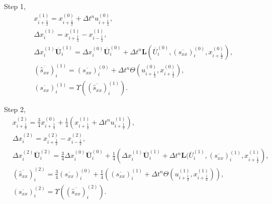 \documentclass{article}
\numberwithin{equation}{section}
\numberwithin{table}{section}
\begin{document}
Step 1,
\begin{equation}
  \begin{aligned}
	& x_{i+\frac{1}{2}}^{(1)} = x_{i+\frac{1}{2}}^{(0)}+\Delta t^n u_{i+\frac{1}{2}}^{(0)},\\
	& \Delta x_i^{(1)} =  x_{i+\frac{1}{2}}^{(1)}- x_{i-\frac{1}{2}}^{(1)},\\
    & \Delta x_i^{(1)} \overline{\bm{U}}_i^{(1)}= \Delta x_i^{(0)} \overline{\bm{U}}_i^{(0)}+\Delta t^n \bm{L}(\overline{U}_i^{(0)}, (\overline{s_{xx}})_i^{(0)}, x_{i+\frac{1}{2}}^{(0)}),\\
	& (\overline{\hat{s}_{xx}})_i^{(1)} = (\overline{s_{xx}})_i^{(0)} +\Delta t^ n  \varTheta (u_{i+\frac{1}{2}}^{(0)}, x_{i+\frac{1}{2}}^{(0)}),\\
  & (\overline{s_{xx}})_i^{(1)} = \Upsilon((\overline{\hat{s}_{xx}})_i^{(1)}).
\end{aligned}
\end{equation}


Step 2,
\begin{equation}
  \begin{aligned}
	& x_{i+\frac{1}{2}}^{(2)} = \frac{3}{4} x_{i+\frac{1}{2}}^{(0)}+\frac{1}{4} \left( x_{i+\frac{1}{2}}^{(1)}+\Delta t^n u_{i+\frac{1}{2}}^{(1)}\right),\\
	& \Delta x_i^{(2)} =  x_{i+\frac{1}{2}}^{(2)}- x_{i-\frac{1}{2}}^{(2)},\\
	& \Delta x_i^{(2)} \overline{\bm{U}}_i^{(2)}  = \frac{3}{4} \Delta x_i^{(0)} \overline{\bm{U}}_i^{(0)}+ \frac{1}{4} \left(  \Delta x_i^{(1)} \overline{\bm{U}}_i^{(1)} + \Delta t^n \bm{L}(\overline{U}_i^{(1)}, (\overline{s_{xx}})_i^{(1)}, x_{i+\frac{1}{2}}^{(1)}\right),\\
	& (\overline{\hat{s}_{xx}})_i^{(2)} =\frac{3}{4} (\overline{s_{xx}})_i^{(0)} + \frac{1}{4} \left(  (\overline{s_{xx}})_i^{(1)}+\Delta t^ n \varTheta (u_{i+\frac{1}{2}}^{(1)}, x_{i+\frac{1}{2}}^{(1)})\right),\\
  & (\overline{s_{xx}})_i^{(2)} = \Upsilon((\overline{\hat{s}_{xx}})_i^{(2)}).
\end{aligned}
\end{equation}
\end{document}
